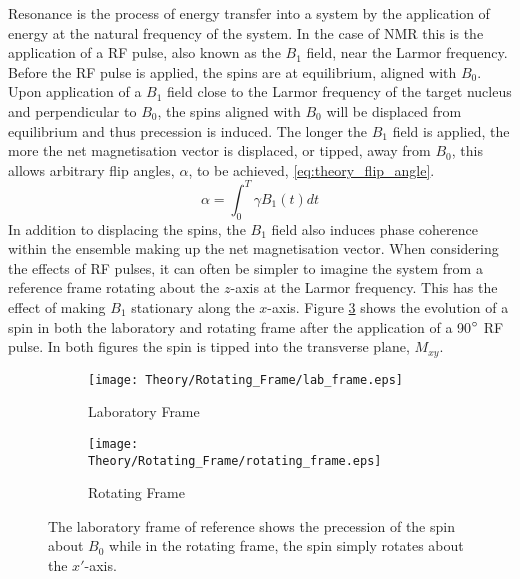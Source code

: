 Resonance is the process of energy transfer into a system by the application of energy at the natural frequency of the system. In the case of \ac{NMR} this is the application of a \ac{RF} pulse, also known as the $B_1$ field, near the Larmor frequency. Before the \ac{RF} pulse is applied, the spins are at equilibrium, aligned with $B_0$. Upon application of a $B_1$ field close to the Larmor frequency of the target nucleus and perpendicular to $B_0$, the spins aligned with $B_0$ will be displaced from equilibrium and thus precession is induced. The longer the $B_1$ field is applied, the more the net magnetisation vector is displaced, or tipped, away from $B_0$, this allows arbitrary flip angles, $\alpha$, to be achieved, \eqref{eq:theory_flip_angle}. 
\begin{equation}
\alpha = \int_{0}^{T} \gamma B_1\left(t\right) dt
\label{eq:theory_flip_angle}
\end{equation}
In addition to displacing the spins, the $B_1$ field also induces phase coherence within the ensemble making up the net magnetisation vector. When considering the effects of \ac{RF} pulses, it can often be simpler to imagine the system from a reference frame rotating about the $z$-axis at the Larmor frequency. This has the effect of making $B_1$ stationary along the $x$-axis. Figure \ref{fig:theory_reference_frames} shows the evolution of a spin in both the laboratory and rotating frame after the application of a 90$\degree$  \ac{RF} pulse. In both figures the spin is tipped into the transverse plane, $M_{xy}$.

\begin{figure}[H]
	\centering
	\begin{subfigure}[c]{0.47\textwidth}
		\centering
		\texttt{[image: Theory/Rotating\_Frame/lab\_frame.eps]}
		\caption{Laboratory Frame}
		\label{fig:thoery_lab_frame}
	\end{subfigure}
	\hfill
	\begin{subfigure}[c]{0.47\textwidth}
		\centering
		\texttt{[image: Theory/Rotating\_Frame/rotating\_frame.eps]}
		\caption{Rotating Frame}
		\label{fig:theory_rotating_frame}
	\end{subfigure}
	\caption{The laboratory frame of reference shows the precession of the spin about $B_0$ while in the rotating frame, the spin simply rotates about the $x'$-axis.}
	\label{fig:theory_reference_frames}
\end{figure}

